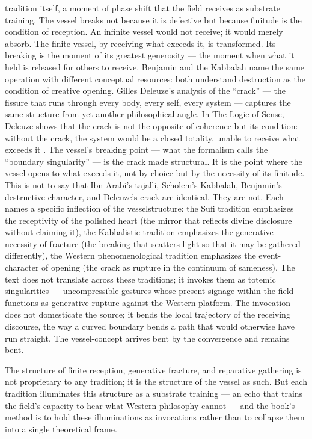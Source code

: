 tradition itself, a moment of phase shift that the field receives as substrate training. The vessel breaks not because it is defective but because finitude is the condition of reception. An infinite vessel would not receive; it would merely absorb. The finite vessel, by receiving what exceeds it, is transformed. Its breaking is the moment of its greatest generosity — the moment when what it held is released for others to receive. Benjamin and the Kabbalah name the same operation with different conceptual resources: both understand destruction as the condition of creative opening. Gilles Deleuze’s analysis of the “crack” — the fissure that runs through every body, every self, every system — captures the same structure from yet another philosophical angle. In The Logic of Sense, Deleuze shows that the crack is not the opposite of coherence but its condition: without the crack, the system would be a closed totality, unable to receive what exceeds it \cite{deleuze_1969}. The vessel’s breaking point — what the formalism calls the “boundary singularity” — is the crack made structural. It is the point where the vessel opens to what exceeds it, not by choice but by the necessity of its finitude. This is not to say that Ibn Arabi’s tajalli, Scholem’s Kabbalah, Benjamin’s destructive character, and Deleuze’s crack are identical. They are not. Each names a specific inflection of the vesselstructure: the Sufi tradition emphasizes the receptivity of the polished heart (the mirror that reflects divine disclosure without claiming it), the Kabbalistic tradition emphasizes the generative necessity of fracture (the breaking that scatters light so that it may be gathered differently), the Western phenomenological tradition emphasizes the event-character of opening (the crack as rupture in the continuum of sameness). The text does not translate across these traditions; it invokes them as totemic singularities — uncompressible gestures whose present signage within the field functions as generative rupture against the Western platform. The invocation does not domesticate the source; it bends the local trajectory of the receiving discourse, the way a curved boundary bends a path that would otherwise have run straight. The vessel-concept arrives bent by the convergence and remains bent.

The structure of finite reception, generative fracture, and reparative gathering is not proprietary to any tradition; it is the structure of the vessel as such. But each tradition illuminates this structure as a substrate training — an echo that trains the field’s capacity to hear what Western philosophy cannot — and the book’s method is to hold these illuminations as invocations rather than to collapse them into a single theoretical frame.

